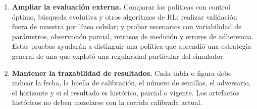 \begin{enumerate}
  \item \textbf{Ampliar la evaluación externa.} Comparar las políticas con control óptimo, búsqueda evolutiva y otros algoritmos de RL; realizar validación fuera de muestra por línea celular; y probar escenarios con variabilidad de parámetros, observación parcial, retrasos de medición y errores de adherencia. Estas pruebas ayudarán a distinguir una política que aprendió una estrategia general de una que explotó una regularidad particular del simulador.

  \item \textbf{Mantener la trazabilidad de resultados.} Cada tabla o figura debe indicar la fecha, la huella de calibración, el número de semillas, el adversario, el horizonte y si el resultado es histórico, parcial o vigente. Los artefactos históricos no deben mezclarse con la corrida calibrada actual.
\end{enumerate}
